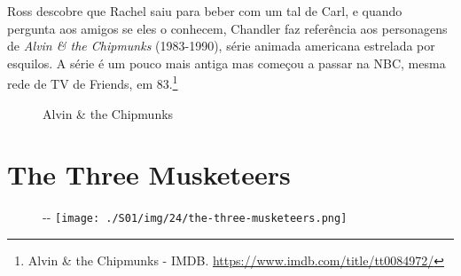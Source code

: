 \saveparinfos
\noindent
\begin{minipage}[c]{0.4\textwidth}\useparinfo

Ross descobre que Rachel saiu para beber com um tal de Carl, e quando
pergunta aos amigos se eles o conhecem, Chandler faz referência aos
personagens de \emph{Alvin \& the Chipmunks} (1983-1990), série animada
americana estrelada por esquilos. A série é um pouco mais antiga mas
começou a passar na NBC, mesma rede de TV de Friends, em 83.\footnote{\sloppy Alvin \& the Chipmunks - IMDB. \url{https://www.imdb.com/title/tt0084972/}}

\end{minipage}\hfill
\begin{minipage}[c]{0.6\textwidth}

\begin{figure}
  \centering
    \caption{Alvin & the Chipmunks\label{fig:alvin-the-chipmunks}}
\end{figure}

\end{minipage}

\hypertarget{the-three-musketeers}{%
\section{The Three Musketeers}\label{the-three-musketeers}}

\begin{figure}[!ht]
  \begin{adjustwidth}{-\oddsidemargin-1in}{-\rightmargin}
    \centering
    \texttt{[image: ./S01/img/24/the-three-musketeers.png]}
  \end{adjustwidth}
\end{figure}

